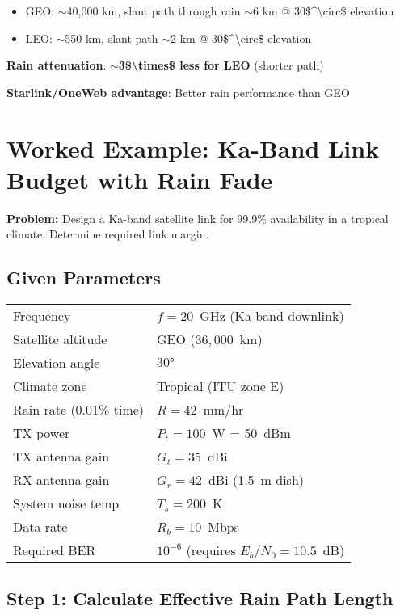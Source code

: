 \begin{itemize}
\tightlist
\item
  GEO: $\sim$40,000 km, slant path through rain
  $\sim$6 km @ 30\$\^{}\textbackslash circ\$ elevation
\item
  LEO: $\sim$550 km, slant path $\sim$2 km @
  30\$\^{}\textbackslash circ\$ elevation
\end{itemize}

\textbf{Rain attenuation}:
\textbf{$\sim$3\$\textbackslash times\$ less for LEO} (shorter
path)

\textbf{Starlink/OneWeb advantage}: Better rain performance than GEO

\section{Worked Example: Ka-Band Link Budget with Rain Fade}

\textbf{Problem:} Design a Ka-band satellite link for 99.9\% availability in a tropical climate. Determine required link margin.

\subsection*{Given Parameters}

\begin{tabular}{@{}ll@{}}
Frequency & $f = 20$~GHz (Ka-band downlink) \\
Satellite altitude & GEO ($36{,}000$~km) \\
Elevation angle & $30°$ \\
Climate zone & Tropical (ITU zone E) \\
Rain rate (0.01\% time) & $R = 42$~mm/hr \\
TX power & $P_t = 100$~W = 50~dBm \\
TX antenna gain & $G_t = 35$~dBi \\
RX antenna gain & $G_r = 42$~dBi (1.5~m dish) \\
System noise temp & $T_s = 200$~K \\
Data rate & $R_b = 10$~Mbps \\
Required BER & $10^{-6}$ (requires $E_b/N_0 = 10.5$~dB) \\
\end{tabular}

\subsection*{Step 1: Calculate Effective Rain Path Length}


